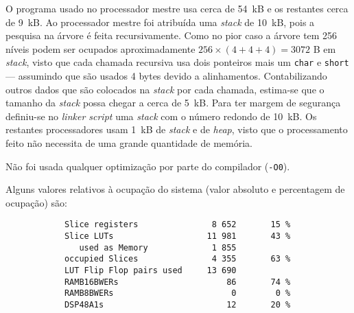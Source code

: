 O programa usado no processador mestre usa cerca de 54~kB e os restantes cerca de 9~kB. Ao processador mestre foi atribuída uma \textit{stack} de 10~kB, pois a pesquisa na árvore é feita recursivamente. Como no pior caso a árvore tem 256 níveis podem ser ocupados aproximadamente $256 \times (4 + 4 + 4) = 3072$ B em \textit{stack}, visto que cada chamada recursiva usa dois ponteiros mais um \texttt{char} e \texttt{short} --- assumindo que são usados 4 bytes devido a alinhamentos. Contabilizando outros dados que são colocados na \textit{stack} por cada chamada, estima-se que o tamanho da \textit{stack} possa chegar a cerca de 5~kB. Para ter margem de segurança definiu-se no \textit{linker script} uma \textit{stack} com o número redondo de 10~kB. Os restantes processadores usam 1~kB de \textit{stack} e de \textit{heap}, visto que o processamento feito não necessita de uma grande quantidade de memória.

Não foi usada qualquer optimização por parte do compilador (\texttt{-O0}).

Alguns valores relativos à ocupação do sistema (valor absoluto e percentagem de ocupação) são:


\begin{verbatim}
            Slice registers               8 652       15 %
            Slice LUTs                   11 981       43 %
               used as Memory             1 855
            occupied Slices               4 355       63 %
            LUT Flip Flop pairs used     13 690
            RAMB16BWERs                      86       74 %
            RAMB8BWERs                        0        0 %
            DSP48A1s                         12       20 %
\end{verbatim}
